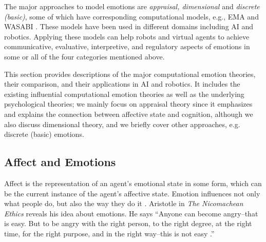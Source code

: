 \documentclass[12pt]{report}
\begin{document}
The major approaches to model emotions are \textit{appraisal, dimensional} and
\textit{discrete (basic)}, some of which have corresponding computational
models, e.g., EMA \cite{marsella:ema-process-model} and WASABI
\cite{becker:wasabi,becker:wasabi-description}. These models have been used in
different domains including AI and robotics. Applying these models can help
robots and virtual agents to achieve communicative, evaluative, interpretive,
and regulatory aspects of emotions in some or all of the four categories
mentioned above.

This section provides descriptions of the major computational emotion theories,
their comparison, and their applications in AI and robotics. It includes the
existing influential computational emotion theories as well as the underlying
psychological theories; we mainly focus on appraisal theory since it
emphasizes and explains the connection between affective state and cognition,
although we also discuss dimensional theory, and we briefly cover other
approaches, e.g. discrete (basic) emotions.

\subsection{Affect and Emotions}
Affect is the representation of an agent's emotional state in some form, which
can be the current instance of the agent's affective state. Emotion influences
not only what people do, but also the way they do it
\cite{cowie:concepts-definitions}. Aristotle in \emph{The Nicomachean Ethics}
reveals his idea about emotions. He says ``Anyone can become angry--that is
easy. But to be angry with the right person, to the right degree, at the right
time, for the right purpose, and in the right way--this is not easy
\cite{aristotle:ethics}.''
\end{document}
